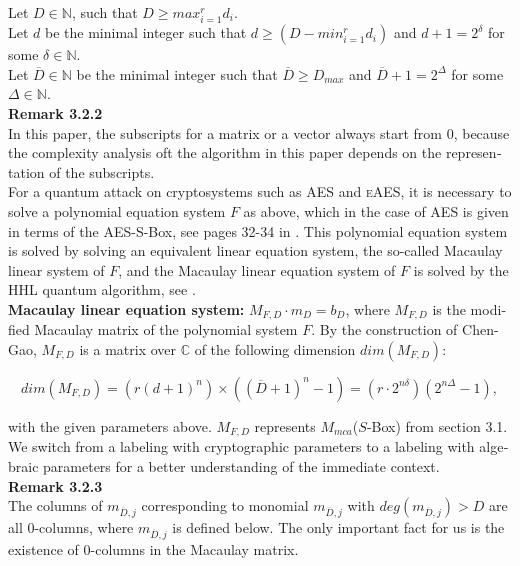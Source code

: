\documentclass[a4paper,11pt]{article}
\begin{document}
\begin{otherlanguage}{english}
\noindent
Let $D \in \mathbb{N}$, such that $D \geq max_{i=1}^r d_i$. \\
Let $d$ be the minimal integer such that $d \geq (D - min_{i=1}^r d_i)$ and $d+1= 2^\delta$ for some $\delta \in \mathbb{N}$. \\
Let $\overline{D} \in \mathbb{N}$ be the minimal integer such that $\overline{D} \geq D_{max}$ and $\overline{D}+1 = 2^\Delta$ for some $\Delta \in \mathbb{N}$. \\ 

\noindent
\textbf{Remark 3.2.2} \\
In this paper, the subscripts for a matrix or a vector always start from 0, because the complexity analysis oft the algorithm in this paper depends on the representation of the subscripts. \\

\noindent
For a quantum attack on cryptosystems such as \textsc{AES} and \textsc{eAES}, it is necessary to solve a polynomial equation system $F$ as above, which in the case of \textsc{AES} is given in terms of the \textsc{AES}-S-Box, see pages 32-34 in \cite{QAA}. This polynomial equation system is solved by solving an equivalent linear equation system, the so-called Macaulay linear system \cite{MCA} of $F$, and the Macaulay linear equation system of $F$ is solved by the \textsc{HHL} quantum algorithm, see \cite{HHL}.\\

\noindent
\textbf{Macaulay linear equation system:} $M_{F,D} \cdot m_D = b_D$,
where $M_{F,D}$ is the modified Macaulay matrix of the polynomial system $F$. By the construction of Chen-Gao, $M_{F,D}$ is a matrix over $\mathbb{C}$ of the following dimension $dim(M_{F,D})$:

$$dim(M_{F,D})= ( r (d+1)^n ) \times ((\overline{D} + 1 )^n -1) 
= (r \cdot 2^{n \delta})(2^{n \Delta} -1 ),$$

\noindent
with the given parameters above. $M_{F,D}$ represents $M_{mca}$($S$-Box) from section 3.1. We switch from a labeling with cryptographic parameters to a labeling with algebraic parameters for a better understanding of the immediate context.\\

\noindent
\textbf{Remark 3.2.3} \\
The columns of $m_{\overline{D},j}$ corresponding to monomial $m_{\overline{D},j}$ with $deg(m_{\overline{D},j}) > D$ are all $0$-columns, where $m_{\overline{D},j}$ is defined below. The only important fact for us is the existence of $0$-columns in the Macaulay matrix. \\


\end{otherlanguage}
\end{document}
